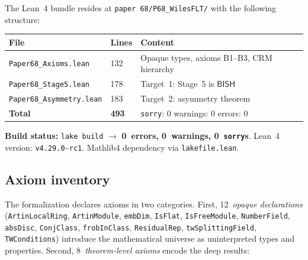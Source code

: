 \documentclass[11pt]{article}
\theoremstyle{plain}
\theoremstyle{definition}
\theoremstyle{remark}
\newcommand{\BISH}{\mathsf{BISH}}
\begin{document}
The Lean~4 bundle resides at \texttt{paper~68/P68\_WilesFLT/}
with the following structure:

\begin{center}
\renewcommand{\arraystretch}{1.15}
\begin{tabular}{@{}llp{6.8cm}@{}}
\toprule
\textbf{File} & \textbf{Lines} & \textbf{Content} \\
\midrule
\texttt{Paper68\_Axioms.lean} & 132 &
  Opaque types, axioms B1--B3, CRM hierarchy \\
\texttt{Paper68\_Stage5.lean} & 178 &
  Target~1: Stage~5 is $\BISH$ \\
\texttt{Paper68\_Asymmetry.lean} & 183 &
  Target~2: asymmetry theorem \\
\midrule
\textbf{Total} & \textbf{493} &
  \texttt{sorry}: 0 \quad warnings: 0 \quad errors: 0 \\
\bottomrule
\end{tabular}
\end{center}

\medskip\noindent
\textbf{Build status:} \texttt{lake build} $\to$
\textbf{0~errors, 0~warnings, 0~\texttt{sorry}s}.
Lean~4 version: \texttt{v4.29.0-rc1}.  Mathlib4 dependency
via \texttt{lakefile.lean}.

\subsection{Axiom inventory}

\begin{sloppypar}
The formalization declares axioms in two categories.  First,
12~\emph{opaque declarations} (\texttt{ArtinLocalRing},
\texttt{ArtinModule}, \texttt{embDim}, \texttt{IsFlat},
\texttt{IsFreeModule}, \texttt{NumberField}, \texttt{absDisc},
\texttt{ConjClass}, \texttt{frobInClass}, \texttt{ResidualRep},
\texttt{twSplittingField}, \texttt{TWConditions}) introduce the
mathematical universe as uninterpreted types and properties.
Second, 8~\emph{theorem-level axioms} encode the deep results:
\end{sloppypar}
\end{document}
